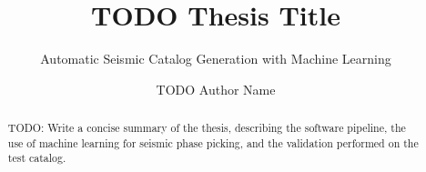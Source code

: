 \documentclass[english,binding=0.6cm]{sapthesis}
\title{TODO Thesis Title}
\subtitle{Automatic Seismic Catalog Generation with Machine Learning}
\author{TODO Author Name}
\begin{document}
\frontmatter
\maketitle

\begin{abstract}
TODO: Write a concise summary of the thesis, describing the software pipeline, the use of machine learning for seismic phase picking, and the validation performed on the test catalog.
\end{abstract}

\tableofcontents

\mainmatter










\backmatter
\cleardoublepage
{}
{}


\end{document}
